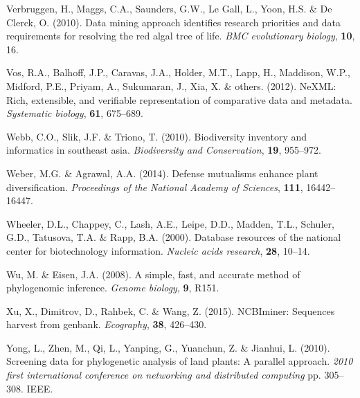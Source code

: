\documentclass[]{article}
\begin{document}
\leavevmode\hypertarget{ref-verbruggen2010data}{}%
Verbruggen, H., Maggs, C.A., Saunders, G.W., Le Gall, L., Yoon, H.S. \& De Clerck, O. (2010). Data mining approach identifies research priorities and data requirements for resolving the red algal tree of life. \emph{BMC evolutionary biology}, \textbf{10}, 16.

\leavevmode\hypertarget{ref-vos2012nexml}{}%
Vos, R.A., Balhoff, J.P., Caravas, J.A., Holder, M.T., Lapp, H., Maddison, W.P., Midford, P.E., Priyam, A., Sukumaran, J., Xia, X. \& others. (2012). NeXML: Rich, extensible, and verifiable representation of comparative data and metadata. \emph{Systematic biology}, \textbf{61}, 675--689.

\leavevmode\hypertarget{ref-webb2010biodiversity}{}%
Webb, C.O., Slik, J.F. \& Triono, T. (2010). Biodiversity inventory and informatics in southeast asia. \emph{Biodiversity and Conservation}, \textbf{19}, 955--972.

\leavevmode\hypertarget{ref-weber2014defense}{}%
Weber, M.G. \& Agrawal, A.A. (2014). Defense mutualisms enhance plant diversification. \emph{Proceedings of the National Academy of Sciences}, \textbf{111}, 16442--16447.

\leavevmode\hypertarget{ref-wheeler2000database}{}%
Wheeler, D.L., Chappey, C., Lash, A.E., Leipe, D.D., Madden, T.L., Schuler, G.D., Tatusova, T.A. \& Rapp, B.A. (2000). Database resources of the national center for biotechnology information. \emph{Nucleic acids research}, \textbf{28}, 10--14.

\leavevmode\hypertarget{ref-wu2008simple}{}%
Wu, M. \& Eisen, J.A. (2008). A simple, fast, and accurate method of phylogenomic inference. \emph{Genome biology}, \textbf{9}, R151.

\leavevmode\hypertarget{ref-xu2015ncbiminer}{}%
Xu, X., Dimitrov, D., Rahbek, C. \& Wang, Z. (2015). NCBIminer: Sequences harvest from genbank. \emph{Ecography}, \textbf{38}, 426--430.

\leavevmode\hypertarget{ref-yong2010screening}{}%
Yong, L., Zhen, M., Qi, L., Yanping, G., Yuanchun, Z. \& Jianhui, L. (2010). Screening data for phylogenetic analysis of land plants: A parallel approach. \emph{2010 first international conference on networking and distributed computing} pp. 305--308. IEEE.
\end{document}
